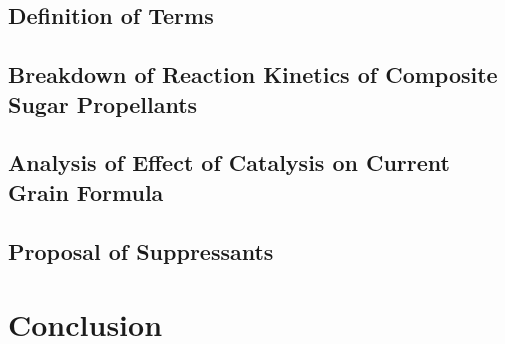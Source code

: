 \documentclass[12pt,letterpaper]{article}
\begin{document}
		\subsection{Definition of Terms}
			\lipsum[1]
        	\subsection{Breakdown of Reaction Kinetics of Composite Sugar Propellants}
                	\lipsum[1-3]
		\subsection{Analysis of Effect of Catalysis on Current Grain Formula}
			\lipsum[1]
		\subsection{Proposal of Suppressants}

	\section{Conclusion}
\end{document}
